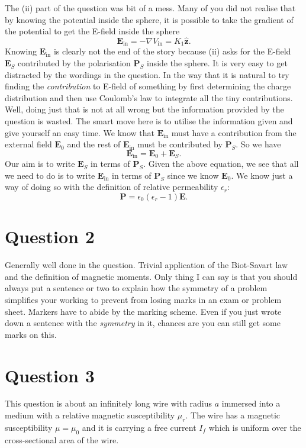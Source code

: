 \documentclass[a4paper]{article}
\begin{document}
The (ii) part of the question was bit of a mess. Many of you did not realise that by knowing the potential inside the sphere, it is possible to take the gradient of the potential to get the E-field inside the sphere 
\[
\mathbf{E}_\text{in} = - \nabla V_\text{in} = K_1 \mathbf{\hat{z}}
.\] 
Knowing $\mathbf{E}_\text{in}$ is clearly not the end of the story because (ii) asks for the E-field $\mathbf{E}_S$ contributed by the polarisation $\mathbf{P}_S$ inside the sphere. It is very easy to get distracted by the wordings in the question. In the way that it is natural to try finding the \emph{contribution} to E-field of something by first determining the charge distribution and then use Coulomb's law to integrate all the tiny contributions. Well, doing just that is not at all wrong but the information provided by the question is wasted. The smart move here is to utilise the information given and give yourself an easy time.
We know that $\mathbf{E}_\text{in}$ must have a contribution from the external field $\mathbf{E}_0$ and the rest of $\mathbf{E}_\text{in}$ must be contributed by $\mathbf{P}_S$.
So we have
\[
\mathbf{E}_\text{in} = \mathbf{E}_0 + \mathbf{E}_S
.\] 
Our aim is to write $\mathbf{E}_S$ in terms of $\mathbf{P}_S$. Given the above equation, we see that all we need to do is to write $\mathbf{E}_\text{in}$ in terms of $\mathbf{P}_S$ since we know $\mathbf{E}_0$. 
We know just a way of doing so with the definition of relative permeability $\epsilon_r$:
 \[
     \mathbf{P} = \epsilon_0 (\epsilon_r - 1) \mathbf{E}
.\] 
\section{Question 2}
\label{sec:question_2}
Generally well done in the question. Trivial application of the Biot-Savart law and the definition of magnetic moments. Only thing I can say is that you should always put a sentence or two to explain how the symmetry of a problem simplifies your working to prevent from losing marks in an exam or problem sheet. 
Markers have to abide by the marking scheme. 
Even if you just wrote down a sentence with the \emph{symmetry} in it, chances are you can still get some marks on this. 

\section{Question 3}
\label{sec:question_3}
This question is about an infinitely long wire with radius $a$ immersed into a medium with a relative magnetic susceptibility $\mu_r$. The wire has a magnetic susceptibility $\mu=\mu_0$ and it is carrying a free current $I_f$ which is uniform over the cross-sectional area of the wire.
\end{document}
